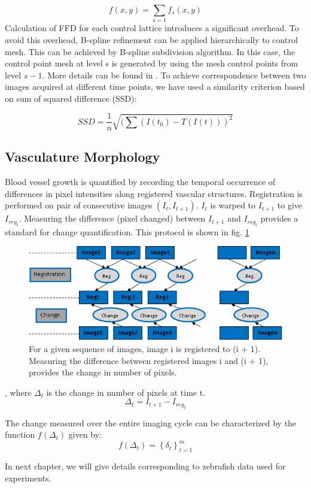 \begin{equation}
f(x,y)= \sum_{s=1}f_{s}(x,y)
\end{equation}
Calculation of FFD for each control lattice introduces a significant overhead. To avoid this overhead, B-spline refinement can be applied hierarchically to control mesh. This can be achieved by B-spline subdivision algorithm. In this case, the control point mesh at level s is generated by using the mesh control points from level $s-1$. More details can be found in \cite{Forsey88}. To achieve correspondence between two images acquired at different time points, we have used a similarity criterion based on sum of squared difference (SSD):

\begin{equation}
SSD = \frac{1}{n} \sqrt{(\sum{(I(t_{0})-T(I(t)))^{2}}}
\end{equation}

\subsection{Vasculature Morphology}\label{quantification}

Blood vessel growth is quantified by recording the temporal occurrence of differences in pixel intensities along registered vascular structures. Registration is performed on pair of consecutive images $(I_{t},I_{t+1})$. $I_{t}$ is warped to $I_{t+1}$ to give $I_{reg_t}$. Measuring the difference (pixel changed) between $I_{t+1}$ and $I_{reg_t}$  provides a standard for change quantification. This protocol is shown in fig. \ref{reg}

\begin{figure}[htb] 
 \begin{center}
    \includegraphics[scale=0.75]{figure/reg_overview.png}
  \end{center}
  \caption[Quantification Procedure]{For a given sequence of images, image i is registered to (i + 1). Measuring the difference between registered images i and (i + 1), provides the change in number of pixels.}
  \label{reg}
\end{figure}

, where $\Delta_{t}$  is the change in number of pixels at time t.
\begin{equation}
\Delta_{t}= I_{t+1} - I_{reg_t}
\end{equation} 


The change measured over the entire imaging cycle can be characterized by the function $f(\Delta_{t})$ given by:
\begin{equation}
f(\Delta_{t})= \left\{\delta_{t}\right\}_{t=1}^{m}
\end{equation}

In next chapter, we will give details corresponding to zebrafish data used for experiments.